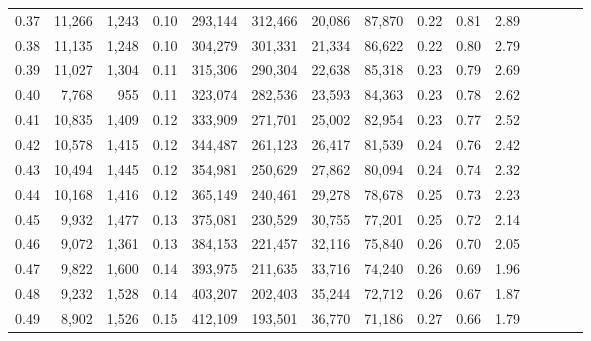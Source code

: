 \begin{tabular}{rrrcrrrrrrrrrrr}
0.37 &  11,266 &  1,243 &                                       0.10 &  293,144 &  312,466 &   20,086 &   87,870 &  0.22 &  0.81 &                         2.89 \\
0.38 &  11,135 &  1,248 &                                       0.10 &  304,279 &  301,331 &   21,334 &   86,622 &  0.22 &  0.80 &                         2.79 \\
0.39 &  11,027 &  1,304 &                                       0.11 &  315,306 &  290,304 &   22,638 &   85,318 &  0.23 &  0.79 &                         2.69 \\
0.40 &   7,768 &    955 &                                       0.11 &  323,074 &  282,536 &   23,593 &   84,363 &  0.23 &  0.78 &                         2.62 \\
0.41 &  10,835 &  1,409 &                                       0.12 &  333,909 &  271,701 &   25,002 &   82,954 &  0.23 &  0.77 &                         2.52 \\
0.42 &  10,578 &  1,415 &                                       0.12 &  344,487 &  261,123 &   26,417 &   81,539 &  0.24 &  0.76 &                         2.42 \\
0.43 &  10,494 &  1,445 &                                       0.12 &  354,981 &  250,629 &   27,862 &   80,094 &  0.24 &  0.74 &                         2.32 \\
0.44 &  10,168 &  1,416 &                                       0.12 &  365,149 &  240,461 &   29,278 &   78,678 &  0.25 &  0.73 &                         2.23 \\
0.45 &   9,932 &  1,477 &                                       0.13 &  375,081 &  230,529 &   30,755 &   77,201 &  0.25 &  0.72 &                         2.14 \\
0.46 &   9,072 &  1,361 &                                       0.13 &  384,153 &  221,457 &   32,116 &   75,840 &  0.26 &  0.70 &                         2.05 \\
0.47 &   9,822 &  1,600 &                                       0.14 &  393,975 &  211,635 &   33,716 &   74,240 &  0.26 &  0.69 &                         1.96 \\
0.48 &   9,232 &  1,528 &                                       0.14 &  403,207 &  202,403 &   35,244 &   72,712 &  0.26 &  0.67 &                         1.87 \\
0.49 &   8,902 &  1,526 &                                       0.15 &  412,109 &  193,501 &   36,770 &   71,186 &  0.27 &  0.66 &                         1.79 \\

\end{tabular}
